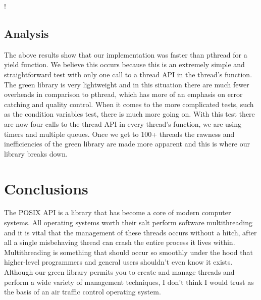 \documentclass[11pt]{article}
\begin{document}
\resizebox {\columnwidth} {!} {
}

\subsection{Analysis}

The above results show that our implementation was faster than pthread for a  yield function. We believe this occurs because this is an extremely simple and straightforward test with only one call to a thread API in the thread's function. The green library is very lightweight and in this situation there are much fewer overheads in comparison to pthread, which has more of an emphasis on error catching and quality control. When it comes to the more complicated tests, such as the condition variables test, there is much more going on. With this test there are now four calls to the thread API in every thread's function, we are using timers and multiple queues. Once we get to 100+ threads the rawness and inefficiencies of the green library are made more apparent and this is where our library breaks down.

\section{Conclusions}\label{conclusions}

The POSIX API is a library that has become a core of modern computer systems. All  operating systems worth their salt perform software multithreading and it is vital that the management of these threads occurs without a hitch, after all a single misbehaving thread can crash the entire process it lives within. Multithreading is something that should occur so smoothly under the hood that higher-level programmers and general users shouldn't even know it exists. 
Although our green library permits you to create and manage threads and perform a wide variety of management techniques, I don't think I would trust as the basis of an air traffic control operating system.
\end{document}
